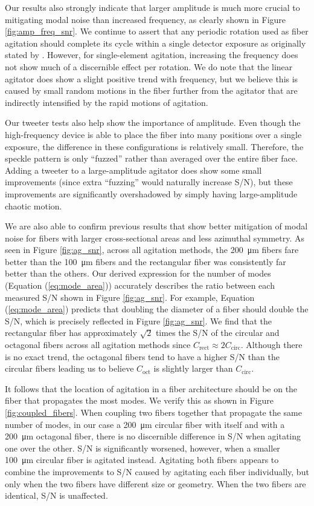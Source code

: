 Our results also strongly indicate that larger amplitude is much more crucial to mitigating modal noise than increased frequency, as clearly shown in Figure \ref{fig:amp_freq_snr}. We continue to assert that any periodic rotation used as fiber agitation should complete its cycle within a single detector exposure as originally stated by \citet{baudrand_modal_2001}. However, for single-element agitation, increasing the frequency does not show much of a discernible effect per rotation. We do note that the linear agitator does show a slight positive trend with frequency, but we believe this is caused by small random motions in the fiber further from the agitator that are indirectly intensified by the rapid motions of agitation.

Our tweeter tests also help show the importance of amplitude. Even though the high-frequency device is able to place the fiber into many positions over a single exposure, the difference in these configurations is relatively small. Therefore, the speckle pattern is only ``fuzzed'' rather than averaged over the entire fiber face. Adding a tweeter to a large-amplitude agitator does show some small improvements (since extra ``fuzzing'' would naturally increase S/N), but these improvements are significantly overshadowed by simply having large-amplitude chaotic motion.

We are also able to confirm previous results that show better mitigation of modal noise for fibers with larger cross-sectional areas and less azimuthal symmetry. As seen in Figure \ref{fig:ag_snr}, across all agitation methods, the \SI{200}{\micro\meter} fibers fare better than the \SI{100}{\micro\meter} fibers and the rectangular fiber was consistently far better than the others. Our derived expression for the number of modes (Equation (\ref{eq:mode_area})) accurately describes the ratio between each measured S/N shown in Figure \ref{fig:ag_snr}. For example, Equation (\ref{eq:mode_area}) predicts that doubling the diameter of a fiber should double the S/N, which is precisely reflected in Figure \ref{fig:ag_snr}. We find that the rectangular fiber has approximately $\sqrt{2}$ times the S/N of the circular and octagonal fibers across all agitation methods since $C_\mathrm{rect} \approx 2C_\mathrm{circ}$. Although there is no exact trend, the octagonal fibers tend to have a higher S/N than the circular fibers leading us to believe $C_\mathrm{oct}$ is slightly larger than $C_\mathrm{circ}$.

It follows that the location of agitation in a fiber architecture should be on the fiber that propagates the most modes. We verify this as shown in Figure \ref{fig:coupled_fibers}. When coupling two fibers together that propagate the same number of modes, in our case a \SI{200}{\micro\meter} circular fiber with itself and with a \SI{200}{\micro\meter} octagonal fiber, there is no discernible difference in S/N when agitating one over the other. S/N is significantly worsened, however, when a smaller \SI{100}{\micro\meter} circular fiber is agitated instead. Agitating both fibers appears to combine the improvements to S/N caused by agitating each fiber individually, but only when the two fibers have different size or geometry. When the two fibers are identical, S/N is unaffected.


